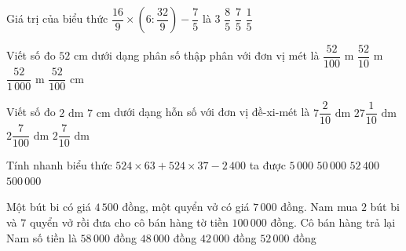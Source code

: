 \begin{ex} %
Giá trị của biểu thức $\dfrac{16}{9} \times \left(6 : \dfrac{32}{9}\right) - \dfrac{7}{5}$ là
\choice
{$3$}
{\True $\dfrac{8}{5}$}
{$\dfrac{7}{5}$}
{$\dfrac{1}{5}$}
\end{ex}

\begin{ex} %
Viết số đo $52\text{ cm}$ dưới dạng phân số thập phân với đơn vị mét là
\choice
{\True $\dfrac{52}{100}\text{ m}$}
{$\dfrac{52}{10}\text{ m}$}
{$\dfrac{52}{1\,000}\text{ m}$}
{$\dfrac{52}{100}\text{ cm}$}
\end{ex}

\begin{ex} %
Viết số đo $2\text{ dm } 7\text{ cm}$ dưới dạng hỗn số với đơn vị đề-xi-mét là
\choice
{$7\dfrac{2}{10}\text{ dm}$}
{$27\dfrac{1}{10}\text{ dm}$}
{$2\dfrac{7}{100}\text{ dm}$}
{\True $2\dfrac{7}{10}\text{ dm}$}
\end{ex}

\begin{ex} %
Tính nhanh biểu thức $524 \times 63 + 524 \times 37 - 2\,400$ ta được
\choice
{$5\,000$}
{\True $50\,000$}
{$52\,400$}
{$500\,000$}
\end{ex}

\begin{ex} %
Một bút bi có giá $4\,500$ đồng, một quyển vở có giá $7\,000$ đồng. Nam mua $2$ bút bi và $7$ quyển vở rồi đưa cho cô bán hàng tờ tiền $100\,000$ đồng. Cô bán hàng trả lại Nam số tiền là
\choice
{$58\,000$ đồng}
{$48\,000$ đồng}
{\True $42\,000$ đồng}
{$52\,000$ đồng}
\end{ex}

